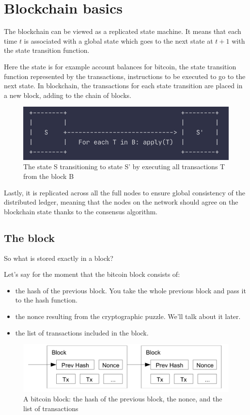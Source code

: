 \section{Blockchain basics}

The blockchain can be viewed as a replicated state machine. It means that  each time $t$ is associated with a global state which goes to the next state at $t+1$ with the state transition function. 

Here the state is for example account balances for bitcoin, the state transition function represented by the transactions, instructions to be executed to go to the next state.
In blockchain, the transactions for each state transition are placed in a new block, adding to the chain of blocks.
\begin{figure}[H]
\centering
\includegraphics[width=0.6\linewidth]{background/state_transition.png}
    \caption{The state S transitioning to state S' by executing all transactions T from the block B}
    \label{fig:state_transition}
\end{figure}
Lastly, it is replicated across all the full nodes to ensure global consistency of the distributed ledger, meaning that the nodes on the network should agree on the blockchain state thanks to the consensus algorithm.

\subsection{The block}
So what is stored exactly in a block? 

Let's say for the moment that the bitcoin block consists of:
\begin{itemize}
    \item the hash of the previous block. You take the whole previous block and pass it to the hash function.
    \item the nonce resulting from the cryptographic puzzle. We'll talk about it later. 
    \item the list of transactions included in the block.
\end{itemize}
\begin{figure}[H]
    \centering
\includegraphics[width=0.6\linewidth]{background/block.png}
    \caption{A bitcoin block: the hash of the previous block, the nonce, and the list of transactions}
    \label{fig:block}
\end{figure}

